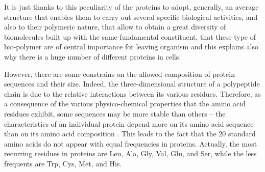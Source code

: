 It is just thanks to this peculiarity of the proteins to adopt, generally, an average structure that enables them to carry out several specific biological activities, and also to their polymeric nature, that allow to obtain a great diversity of biomolecules built up with the same fundamental constituent, that these type of bio-polymer are of central importance for leaving organism and this explains also why there is a huge number of different proteins in cells.  

However, there are some constrains on the allowed composition of protein sequences and their size. 
Indeed, the three-dimensional structure of a polypeptide chain is due to the relative interactions between its various residues. Therefore, as a consequence of the various physico-chemical properties that the amino acid residues exhibit, some sequences may be more stable than others -- the characteristics of an individual protein depend more on its amino acid sequence than on its amino acid composition
\cite{voet2016fundamentals}. 
This leads to the fact that the 20 standard amino acids do not appear with equal frequencies in proteins. Actually, the most recurring residues in proteins are Leu, Ala, Gly, Val, Glu, and Ser, while the less frequents are Trp, Cys, Met, and His. 

